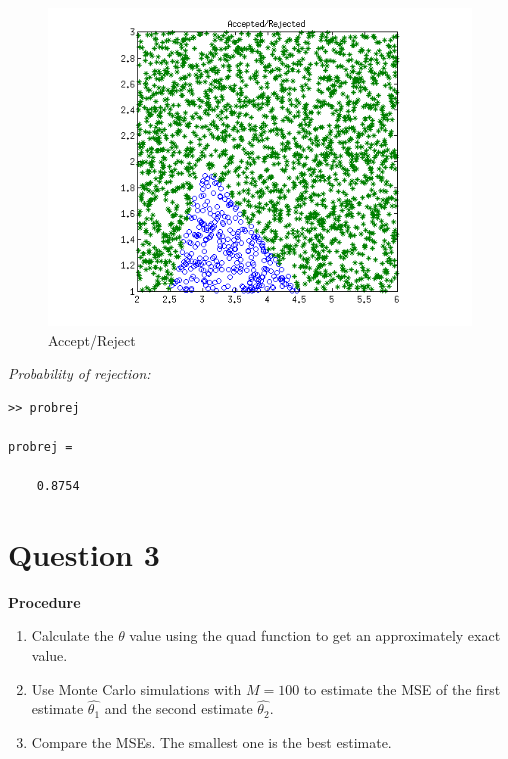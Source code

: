 \documentclass[12pt,a4paper]{article}
\begin{document}
\begin{figure}[ht!]
\begin{center}
\includegraphics[scale=.9]{q2_graph.png}
\caption{Accept/Reject}
\label{q2 fig2}
\end{center}
\end{figure}
\FloatBarrier

\textit{Probability of rejection:}
\begin{verbatim}
>> probrej

probrej =

    0.8754
\end{verbatim}

\clearpage

\section*{Question 3}

\textbf{Procedure}\\

\begin{enumerate}
\item{
Calculate the $\theta$ value using the quad function to get an approximately exact value.
}

\item{

Use Monte Carlo simulations with $M=100$ to estimate the MSE of the first estimate $\hat{\theta_1}$ and the second estimate $\hat{\theta_2}$.
}

\item{
Compare the MSEs. The smallest one is the best estimate.
}
\end{enumerate}
\end{document}

